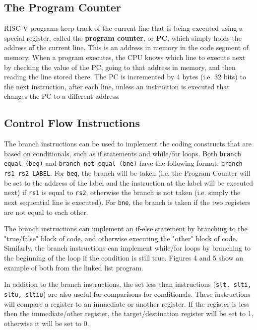\documentclass{article}
\begin{document}
\subsection{The Program Counter}
RISC-V programs keep track of the current line that is being executed using a special register, called the \textbf{program counter}, or \textbf{PC}, which simply holds the address of the current line. This is an address in memory in the code segment of memory. When a program executes, the CPU knows which line to execute next by checking the value of the PC, going to that address in memory, and then reading the line stored there. The PC is incremented by 4 bytes (i.e. 32 bits) to the next instruction, after each line, unless an instruction is executed that changes the PC to a different address.

\subsection{Control Flow Instructions}
The branch instructions can be used to implement the coding constructs that are based on conditionals, such as if statements and while/for loops. Both \texttt{branch equal (beq)} and \texttt{branch not equal (bne)} have the following format: \texttt{branch rs1 rs2 LABEL}. For \texttt{beq}, the branch will be taken (i.e. the Program Counter will be set to the address of the label and the instruction at the label will be executed next) if \texttt{rs1} is equal to \texttt{rs2}, otherwise the branch is not taken (i.e. simply the next sequential line is executed). For \texttt{bne}, the branch is taken if the two registers are not equal to each other. 

The branch instructions can implement an if-else statement by branching to the "true/false" block of code, and otherwise executing the "other" block of code. Similarly, the branch instructions can implement while/for loops by branching to the beginning of the loop if the condition is still true. Figures 4 and 5 show an example of both from the linked list program.

In addition to the branch instructions, the set less than instructions (\texttt{slt, slti, sltu, sltiu}) are also useful for comparisons for conditionals. These instructions will compare a register to an immediate or another register. If the register is less then the immediate/other register, the target/destination register will be set to 1, otherwise it will be set to 0.
\end{document}
